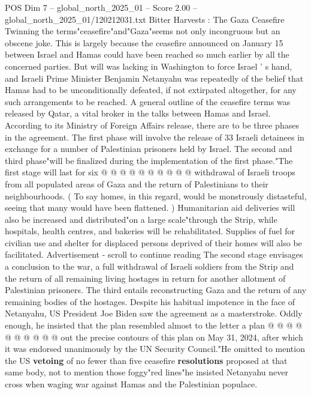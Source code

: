 \begin{textsample}{POS Dim 7 – global\_north\_2025\_01 – Score 2.00 – global\_north\_2025\_01/120212031.txt}  \label{ex:f7_pos_393}
Bitter Harvests : The Gaza Ceasefire Twinning the terms"ceasefire"and"Gaza"seems not only incongruous but an obscene joke.
This is largely because the ceasefire announced on January 15 between Israel and Hamas could have been reached so much earlier by all the concerned parties.
But will was lacking in Washington to force Israel ' s hand, and Israeli Prime Minister Benjamin Netanyahu was repeatedly of the belief that Hamas had to be unconditionally defeated, if not extirpated altogether, for any such arrangements to be reached.
A general outline of the ceasefire terms was released by Qatar, a vital broker in the talks between Hamas and Israel.
According to its Ministry of Foreign Affairs release, there are to be three phases in the agreement.
The first phase will involve the release of 33 Israeli detainees in exchange for a number of Palestinian prisoners held by Israel.
The second and third phase"will be finalized during the implementation of the first phase."The first stage will last for six @ @ @ @ @ @ @ @ @ @ withdrawal of Israeli troops from all populated areas of Gaza and the return of Palestinians to their neighbourhoods. ( To say homes, in this regard, would be monstrously distasteful, seeing that many would have been flattened. ) Humanitarian aid deliveries will also be increased and distributed"on a large scale"through the Strip, while hospitals, health centres, and bakeries will be rehabilitated.
Supplies of fuel for civilian use and shelter for displaced persons deprived of their homes will also be facilitated.
Advertisement - scroll to continue reading The second stage envisages a conclusion to the war, a full withdrawal of Israeli soldiers from the Strip and the return of all remaining living hostages in return for another allotment of Palestinian prisoners.
The third entails reconstructing Gaza and the return of any remaining bodies of the hostages.
Despite his habitual impotence in the face of Netanyahu, US President Joe Biden saw the agreement as a masterstroke.
Oddly enough, he insisted that the plan resembled almost to the letter a plan @ @ @ @ @ @ @ @ @ @ out the precise contours of this plan on May 31, 2024, after which it was endorsed unanimously by the UN Security Council."He omitted to mention the US \textbf{vetoing} of no fewer than five ceasefire \textbf{resolutions} proposed at that same body, not to mention those foggy"red lines"he insisted Netanyahu never cross when waging war against Hamas and the Palestinian populace.

\end{textsample}
